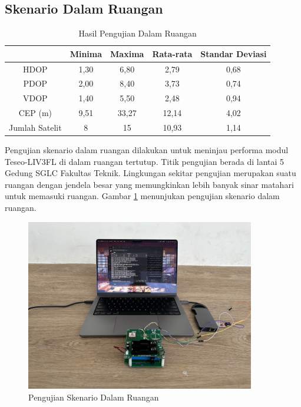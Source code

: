 \subsection{Skenario Dalam Ruangan}
\begin{table}[H]
	\caption{Hasil Pengujian Dalam Ruangan}
	\vspace{0.5em}
	\centering
	\begin{tabular}{ccccc}
		\hline
		& \textbf{Minima} & \textbf{Maxima} & \textbf{Rata-rata} & \textbf{Standar Deviasi}\\
		\hline 
		HDOP & 1,30 & 6,80 & 2,79 & 0,68\\
		PDOP & 2,00 & 8,40 & 3,73 & 0,74\\
		VDOP & 1,40 & 5,50 & 2,48 & 0,94\\
		CEP (m) & 9,51	& 33,27 & 12,14 & 4,02\\
		Jumlah Satelit & 8 & 15 & 10,93 & 1,14\\
		\hline
	\end{tabular}
	\label{Tab: indoor-table}
\end{table}

Pengujian skenario dalam ruangan dilakukan untuk meninjau performa modul Teseo-LIV3FL di dalam ruangan tertutup. Titik pengujian berada di lantai 5 Gedung SGLC Fakultas Teknik. Lingkungan sekitar pengujian merupakan suatu ruangan dengan jendela besar yang memungkinkan lebih banyak sinar matahari untuk memasuki ruangan. Gambar \ref{Fig: indoor-keadaan} menunjukan pengujian skenario dalam ruangan.

\begin{figure}[ht]
	\centering
	\includegraphics[width=10cm]{contents/chapter-4/2-skenario-indoor/keadaan.jpg}
	\caption{Pengujian Skenario Dalam Ruangan}
	\label{Fig: indoor-keadaan}
\end{figure}

